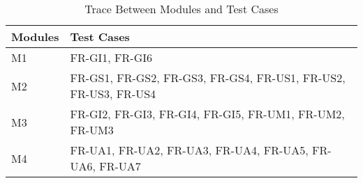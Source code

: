 \documentclass{article}
\begin{document}
\hfill
\begin{table}[H]
    \centering
    \begin{tabular}{p{} p{}}
        \toprule
        \textbf{Modules} & \textbf{Test Cases} \\
        \midrule
         M1 &  FR-GI1, FR-GI6\\
         M2 &  FR-GS1, FR-GS2, FR-GS3, FR-GS4, FR-US1, FR-US2, FR-US3, FR-US4\\
         M3 &  FR-GI2, FR-GI3, FR-GI4, FR-GI5, FR-UM1, FR-UM2, FR-UM3\\
         M4 &  FR-UA1, FR-UA2, FR-UA3, FR-UA4, FR-UA5, FR-UA6, FR-UA7\\
              \bottomrule
    \end{tabular}
    \caption{Trace Between Modules and Test Cases}
    \label{TblMT}
\end{table}
\end{document}
